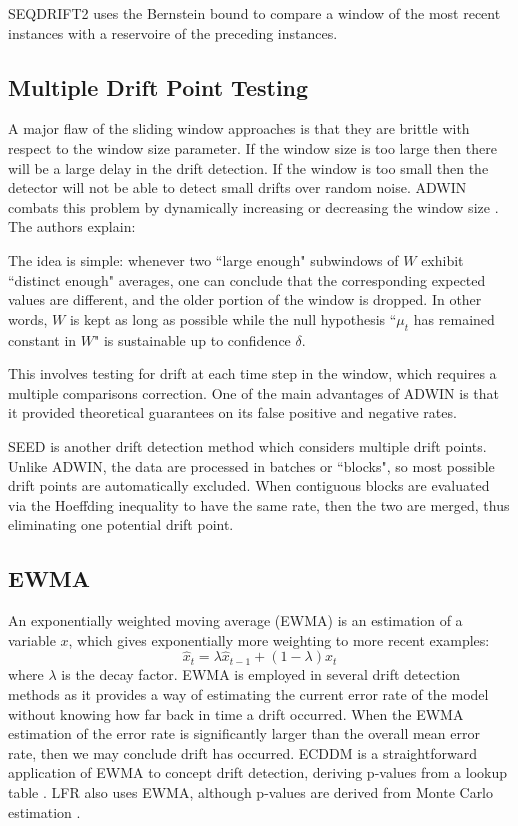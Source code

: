 SEQDRIFT2 \cite{SEQDRIFT} uses the Bernstein bound to compare a window of the most recent instances with a reservoire of the preceding instances.

\subsection{Multiple Drift Point Testing}

A major flaw of the sliding window approaches is that they are brittle with respect to the window size parameter. If the window size is too large then there will be a large delay in the drift detection. If the window is too small then the detector will not be able to detect small drifts over random noise. ADWIN combats this problem by dynamically increasing or decreasing the window size \cite{ADWIN}. The authors explain:
\begin{displayquote}
    The idea is simple: whenever two ``large enough" subwindows of $W$ exhibit ``distinct enough" averages, one can conclude that the corresponding expected values are different, and the older portion of the window is dropped. In other words, $W$ is kept as long as possible while the null hypothesis ``$\mu_t$ has remained constant in $W$" is sustainable up to confidence $\delta$.
\end{displayquote}
This involves testing for drift at each time step in the window, which requires a multiple comparisons correction. One of the main advantages of ADWIN is that it provided theoretical guarantees on its false positive and negative rates.

SEED \cite{SEED} is another drift detection method which considers multiple drift points. Unlike ADWIN, the data are processed in batches or ``blocks", so most possible drift points are automatically excluded. When contiguous blocks are evaluated via the Hoeffding inequality to have the same rate, then the two are merged, thus eliminating one potential drift point.

\subsection{EWMA}

An exponentially weighted moving average (EWMA) is an estimation of a variable $x$, which gives exponentially more weighting to more recent examples:
\begin{equation}
  \hat{x}_t = \lambda \hat{x}_{t-1} + (1-\lambda) x_t
\end{equation}
where $\lambda$ is the decay factor. EWMA is employed in several drift detection methods as it provides a way of estimating the current error rate of the model without knowing how far back in time a drift occurred. When the EWMA estimation of the error rate is significantly larger than the overall mean error rate, then we may conclude drift has occurred. ECDDM is a straightforward application of EWMA to concept drift detection, deriving p-values from a lookup table \cite{ECDDM}. LFR also uses EWMA, although p-values are derived from Monte Carlo estimation \cite{LFR}.

